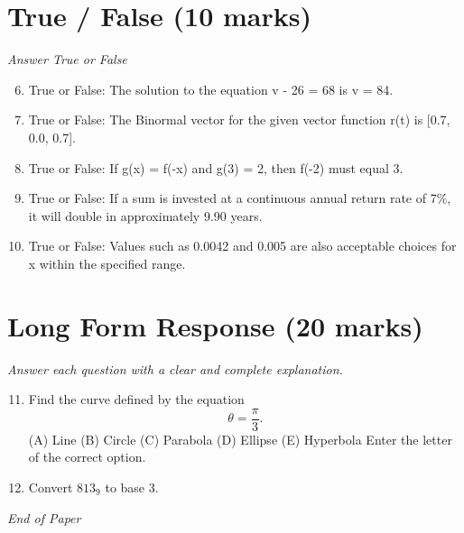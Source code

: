 \documentclass[12pt]{article}
\begin{document}
\section*{True / False (10 marks)}
\textit{Answer True or False}
\begin{enumerate}[label=\arabic*.]
\setcounter{enumi}{5}
\item True or False: The solution to the equation v - 26 = 68 is v = 84.
\item True or False: The Binormal vector for the given vector function r(t) is [0.7, 0.0, 0.7].
\item True or False: If g(x) = f(-x) and g(3) = 2, then f(-2) must equal 3.
\item True or False: If a sum is invested at a continuous annual return rate of 7\%, it will double in approximately 9.90 years.
\item True or False: Values such as 0.0042 and 0.005 are also acceptable choices for x within the specified range.
\end{enumerate}

\section*{Long Form Response (20 marks)}
\textit{Answer each question with a clear and complete explanation.}
\begin{enumerate}[label=\arabic*.]
\setcounter{enumi}{10}
\item Find the curve defined by the equation \[\theta = \frac{\pi}{3}.\](A) Line (B) Circle (C)
Parabola (D) Ellipse (E) Hyperbola Enter the letter of the correct option.
\item Convert $813_9$ to base 3.
\end{enumerate}

\vfill
\noindent\textit{End of Paper}
\end{document}
